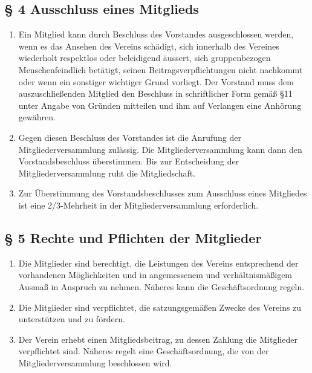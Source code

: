 ﻿\documentclass[10pt,a4paper]{scrartcl}
\begin{document}
\subsection*{§ 4 Ausschluss eines Mitglieds }
\begin{enumerate}
        \item Ein Mitglied kann durch Beschluss des Vorstandes ausgeschlossen werden, wenn es das
                Ansehen des Vereins schädigt, sich innerhalb des Vereines wiederholt respektlos oder 
                beleidigend äussert, sich gruppenbezogen Menschenfeindlich betätigt, seinen Beitragsverpflichtungen nicht nachkommt oder 
                wenn ein sonstiger wichtiger Grund vorliegt. Der Vorstand muss dem auszuschließenden
                Mitglied den Beschluss in schriftlicher Form gemäß §11 unter Angabe von Gründen
                mitteilen und ihm auf Verlangen eine Anhörung gewähren.
        \item Gegen diesen Beschluss des Vorstandes ist die Anrufung der Mitgliederversammlung zu\-läs\-sig. Die Mitgliederversammlung kann dann den Vorstandsbeschluss überstimmen.
				Bis zur Entscheidung der Mitgliederversammlung ruht die Mitgliedschaft.
		\item Zur Überstimmung des Vorstandsbeschlusses zum Ausschluss eines Mitgliedes ist eine 2/3-Mehrheit in der Mitgliederversammlung erforderlich.

\end{enumerate}
%
%
\subsection*{§ 5 Rechte und Pflichten der Mitglieder}
\begin{enumerate}
        \item Die Mitglieder sind berechtigt, die Leistungen des Vereins entsprechend der vorhandenen
                Möglichkeiten und in angemessenem und verhältnismäßigem Ausmaß in Anspruch zu nehmen.
                Nä\-he\-res kann die Geschäftsordnung regeln.
        \item Die Mitglieder sind verpflichtet, die satzungsgemäßen Zwecke des Vereins zu unterstützen
                und zu fördern.
        \item Der Verein erhebt einen Mitgliedsbeitrag, zu dessen Zahlung die Mitglieder verpflichtet
                sind. Näheres regelt eine Geschäftsordnung, die von der Mitgliederversammlung beschlossen
                wird.
        
\end{enumerate}
%
%
\end{document}
